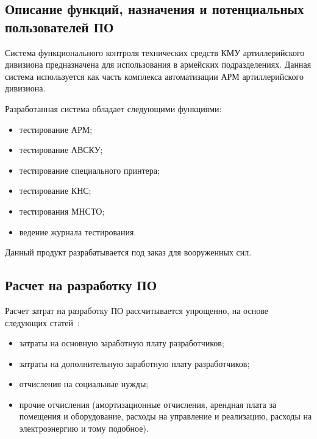 


\FPeval{\cleanProfitDevExact}{\productPrice - \ndsExact - \totalExpensesExact}






\subsection{Описание функций, назначения и потенциальных пользователей ПО}

Система функционального контроля технических средств КМУ артиллерийского дивизиона предназначена для использования в
армейских подразделениях. Данная система используется как часть комплекса автоматизации АРМ артиллерийского дивизиона.

Разработанная система обладает следующими функциями:
\begin{itemize}
		\item тестирование АРМ;
		\item тестирование АВСКУ;
		\item тестирование специального принтера;
		\item тестирование КНС;
		\item тестирования МНСТО;
		\item ведение журнала тестирования.
\end{itemize}

Данный продукт разрабатывается под заказ для вооруженных сил.

\subsection{Расчет на разработку ПО}

Расчет затрат на разработку ПО рассчитывается упрощенно, на основе следующих статей~\cite{economics_diploma}:
\begin{itemize}
	\item затраты на основную заработную плату разработчиков;
	\item затраты на дополнительную заработную плату разработчиков;
	\item отчисления на социальные нужды;
	\item прочие отчисления (амортизационные отчисления, арендная плата за помещения и
		оборудование, расходы на управление и реализацию, расходы на электроэнергию и тому подобное).
\end{itemize}

